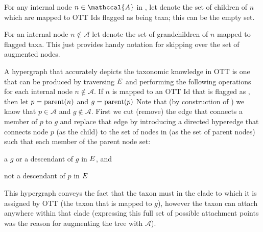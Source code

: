 \documentclass[11pt]{article}
\begin{document}
For any internal node $n\in\mathccal{A}$ in \augmentedFullTree, let 
     denote the set of children
    of $n$ which are mapped to OTT Ids flagged as being \insed taxa; this can be the empty set.

For an internal node $n\notin\mathcal{A}$ let  denote the set of grandchildren
    of $n$ mapped to flagged taxa. This just provides handy notation for skipping over the 
    set of augmented nodes.

A hypergraph \specHyper that accurately depicts the taxonomic knowledge in OTT is one that can be produced by
    traversing $E$ and performing the following operations for each internal node $n\notin \mathcal{A}$.
If $n$ is mapped to an OTT Id that is flagged as \insed, then let $p=\mbox{parent}(n)$ and $g=\mbox{parent}(p)$
Note that (by construction of \augmentedFullTree) we know that 
    $p\in\mathcal{A}$ and $g\notin\mathcal{A}$.
First we cut (remove) the edge that connects a member of $p$ to $g$
    and replace that edge by introducing a directed hyperedge that connects node
    $p$ (as the child) to the set of nodes in \augmentedFullTree (as the set of parent nodes)
    such that each member of the parent node set:
\begin{compactitem}
    \item a $g$ or a descendant of $g$ in $E$, and
    \item not a descendant of $p$ in $E$
\end{compactitem}
This hypergraph conveys the fact that the \insed taxon must in the clade to which it is 
    assigned by OTT (the taxon that is mapped to $g$),
    however the \insed taxon can attach anywhere within that clade (expressing
    this full set of possible attachment points was the reason for augmenting the tree
    with $\mathcal{A}$).
\end{document}
